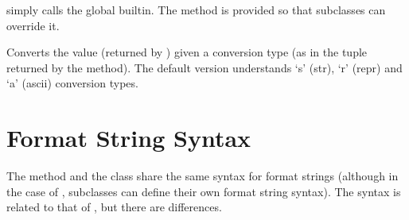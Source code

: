 \documentclass[letterpaper,10pt,english]{sphinxmanual}
\begin{document}
\begin{fulllineitems}
\vspace{5px}

\begin{fulllineitems}
\label{\detokenize{string:string.Formatter.format_field}}
{\hyperref[\detokenize{string:string.Formatter.format_field}]{}} simply calls the global {\hyperref[\detokenize{string:string.Formatter.format}]{}} built\sphinxhyphen{}in.  The
method is provided so that subclasses can override it.

\end{fulllineitems}


\vspace{5px}

\begin{fulllineitems}
\label{\detokenize{string:string.Formatter.convert_field}}
Converts the value (returned by {\hyperref[\detokenize{string:string.Formatter.get_field}]{}}) given a conversion type
(as in the tuple returned by the {\hyperref[\detokenize{string:string.Formatter.parse}]{}} method).  The default
version understands ‘s’ (str), ‘r’ (repr) and ‘a’ (ascii) conversion
types.

\end{fulllineitems}


\end{fulllineitems}



\section{Format String Syntax}
\label{\detokenize{string:format-string-syntax}}\label{\detokenize{string:formatstrings}}
The  method and the {\hyperref[\detokenize{string:string.Formatter}]{}} class share the same
syntax for format strings (although in the case of {\hyperref[\detokenize{string:string.Formatter}]{}},
subclasses can define their own format string syntax).  The syntax is
related to that of , but
there are differences.
\end{document}
